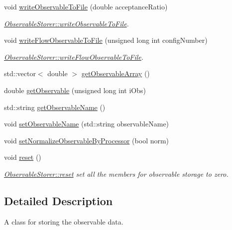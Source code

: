 \begin{DoxyCompactItemize}
\item 
void \mbox{\hyperlink{class_observable_storer_a146f9acb8a0a2ce15782d26bdc4f0bf9}{write\+Observable\+To\+File}} (double acceptance\+Ratio)
\begin{DoxyCompactList}\small\item\em \mbox{\hyperlink{class_observable_storer_a146f9acb8a0a2ce15782d26bdc4f0bf9}{Observable\+Storer\+::write\+Observable\+To\+File}}. \end{DoxyCompactList}\item 
void \mbox{\hyperlink{class_observable_storer_af51ebd65eae2a5087cfd47ddf230da93}{write\+Flow\+Observable\+To\+File}} (unsigned long int config\+Number)
\begin{DoxyCompactList}\small\item\em \mbox{\hyperlink{class_observable_storer_af51ebd65eae2a5087cfd47ddf230da93}{Observable\+Storer\+::write\+Flow\+Observable\+To\+File}}. \end{DoxyCompactList}\item 
std\+::vector$<$ double $>$ \mbox{\hyperlink{class_observable_storer_ab8885ce7eb3baa3fdb39cda767be6c83}{get\+Observable\+Array}} ()
\item 
double \mbox{\hyperlink{class_observable_storer_af03e1c58c3e0efff251ef9b65cc8d152}{get\+Observable}} (unsigned long int i\+Obs)
\item 
std\+::string \mbox{\hyperlink{class_observable_storer_aa04dd06fe053670f4c8f027aa744277a}{get\+Observable\+Name}} ()
\item 
void \mbox{\hyperlink{class_observable_storer_a7f4847c4fdbf8764d8f07950c4d4b62a}{set\+Observable\+Name}} (std\+::string observable\+Name)
\item 
void \mbox{\hyperlink{class_observable_storer_a6177ade7609fb0e4b739955eecba20e6}{set\+Normalize\+Observable\+By\+Processor}} (bool norm)
\item 
void \mbox{\hyperlink{class_observable_storer_a7b6285a532d796816d75262f91d43dad}{reset}} ()
\begin{DoxyCompactList}\small\item\em \mbox{\hyperlink{class_observable_storer_a7b6285a532d796816d75262f91d43dad}{Observable\+Storer\+::reset}} set all the members for observable storage to zero. \end{DoxyCompactList}\end{DoxyCompactItemize}


\subsection{Detailed Description}
A class for storing the observable data. 

